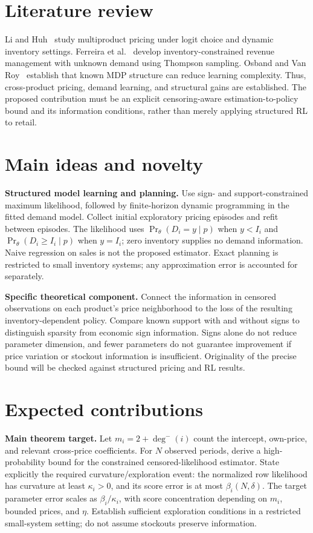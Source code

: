 \documentclass[10pt]{article}
\begin{document}
\section{Literature review}
Li and Huh~\cite{lihuh} study multiproduct pricing under logit choice and dynamic inventory settings. Ferreira et al.~\cite{ferreira} develop inventory-constrained revenue management with unknown demand using Thompson sampling. Osband and Van Roy~\cite{factored} establish that known MDP structure can reduce learning complexity. Thus, cross-product pricing, demand learning, and structural gains are established. The proposed contribution must be an explicit censoring-aware estimation-to-policy bound and its information conditions, rather than merely applying structured RL to retail.

\section{Main ideas and novelty}
\textbf{Structured model learning and planning.} Use sign- and support-constrained maximum likelihood, followed by finite-horizon dynamic programming in the fitted demand model. Collect initial exploratory pricing episodes and refit between episodes. The likelihood uses $\Pr_\theta(D_i=y\mid p)$ when $y<I_i$ and $\Pr_\theta(D_i\ge I_i\mid p)$ when $y=I_i$; zero inventory supplies no demand information. Naive regression on sales is not the proposed estimator. Exact planning is restricted to small inventory systems; any approximation error is accounted for separately.

\textbf{Specific theoretical component.} Connect the information in censored observations on each product's price neighborhood to the loss of the resulting inventory-dependent policy. Compare known support with and without signs to distinguish sparsity from economic sign information. Signs alone do not reduce parameter dimension, and fewer parameters do not guarantee improvement if price variation or stockout information is insufficient. Originality of the precise bound will be checked against structured pricing and RL results.

\newpage
\section{Expected contributions}
\textbf{Main theorem target.} Let $m_i=2+\deg^-(i)$ count the intercept, own-price, and relevant cross-price coefficients. For $N$ observed periods, derive a high-probability bound for the constrained censored-likelihood estimator. State explicitly the required curvature/exploration event: the normalized row likelihood has curvature at least $\kappa_i>0$, and its score error is at most $\beta_i(N,\delta)$. The target parameter error scales as $\beta_i/\kappa_i$, with score concentration depending on $m_i$, bounded prices, and $\eta$. Establish sufficient exploration conditions in a restricted small-system setting; do not assume stockouts preserve information.
\end{document}
